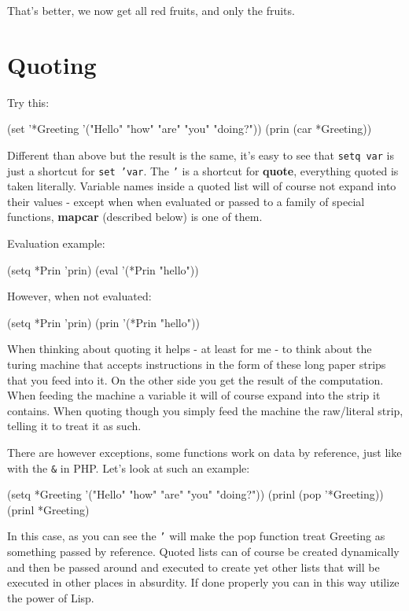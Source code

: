 That's better, we now get all red fruits, and only the fruits.

\section{Quoting}
\label{sec:reg-and-quot-quoting}

Try this:

\begin{wideverbatim}
(set '*Greeting '("Hello" "how" "are" "you" "doing?"))
(prin (car *Greeting))
\end{wideverbatim}

Different than above but the result is the same, it's easy to see that
\texttt{setq var} is just a shortcut for \texttt{set 'var}. The
\texttt{'} is a shortcut for \textbf{quote}, everything quoted is
taken literally. Variable names inside a quoted list will of course
not expand into their values - except when when evaluated or passed to
a family of special functions, \textbf{mapcar} (described below) is
one of them.

Evaluation example:

\begin{wideverbatim}
(setq *Prin 'prin)
(eval '(*Prin "hello"))
\end{wideverbatim}

However, when not evaluated:

\begin{wideverbatim}
(setq *Prin 'prin)
(prin '(*Prin "hello"))
\end{wideverbatim}

When thinking about quoting it helps - at least for me - to think about
the turing machine that accepts instructions in the form of these long
paper strips that you feed into it. On the other side you get the result
of the computation. When feeding the machine a variable it will of
course expand into the strip it contains. When quoting though you simply
feed the machine the raw/literal strip, telling it to treat it as such.

There are however exceptions, some functions work on data by reference,
just like with the \texttt{\&} in PHP. Let's look at such an example:

\begin{wideverbatim}
(setq *Greeting '("Hello" "how" "are" "you" "doing?"))
(prinl (pop '*Greeting))
(prinl *Greeting)
\end{wideverbatim}

In this case, as you can see the \texttt{'} will make the pop function
treat Greeting as something passed by reference. Quoted lists can of
course be created dynamically and then be passed around and executed
to create yet other lists that will be executed in other places in
absurdity. If done properly you can in this way utilize the power of
Lisp.

